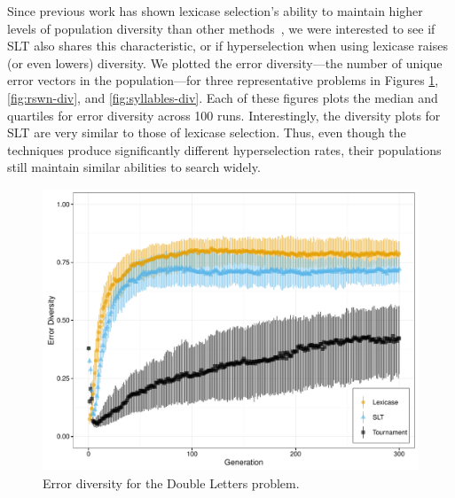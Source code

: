 \documentclass{sig-alternate}
\begin{document}
Since previous work has shown lexicase selection's ability to maintain higher levels of population diversity than other methods~\cite{Helmuth:2015:GPTP}, we were interested to see if SLT also shares this characteristic, or if hyperselection when using lexicase raises (or even lowers) diversity. We plotted the error diversity---the number of unique error vectors in the population---for three representative problems in Figures \ref{fig:dl-div}, \ref{fig:rswn-div}, and \ref{fig:syllables-div}. Each of these figures plots the median and quartiles for error diversity across 100 runs. Interestingly, the diversity plots for SLT are very similar to those of lexicase selection. Thus, even though the techniques produce significantly different hyperselection rates, their populations still maintain similar abilities to search widely.

\begin{figure}[t] %
\centering
\includegraphics[width=\linewidth]{double-letters-div.pdf}
\caption{Error diversity for the Double Letters problem.}
\label{fig:dl-div}
\end{figure}
\end{document}
